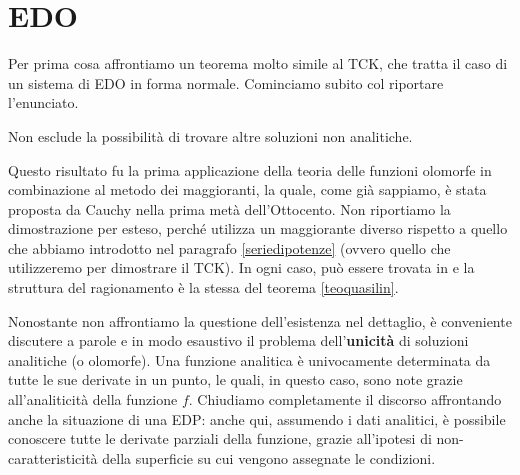 \newpage
\section{EDO}

Per prima cosa affrontiamo un teorema molto simile al TCK, che tratta il caso di un sistema di EDO in forma normale.
Cominciamo subito col riportare l'enunciato.

\begin{theorem}\label{teoedo}
{
}
\end{theorem}

\begin{remark}
Non esclude la possibilità di trovare altre soluzioni non analitiche.
\end{remark}

Questo risultato fu la prima applicazione della teoria delle funzioni olomorfe in combinazione al metodo dei maggioranti, la quale, come già sappiamo, è stata proposta da Cauchy nella prima metà dell'Ottocento.
Non riportiamo la dimostrazione per esteso, perché utilizza un maggiorante diverso rispetto a quello che abbiamo introdotto nel paragrafo \ref{seriedipotenze} (ovvero quello che utilizzeremo per dimostrare il TCK). 
In ogni caso, può essere trovata in \cite{Delf} e la struttura del ragionamento è la stessa del teorema \ref{teoquasilin}.

Nonostante non affrontiamo la questione dell'esistenza nel dettaglio, è conveniente discutere a parole e in modo esaustivo il problema dell'\textbf{unicità} di soluzioni analitiche (o olomorfe). Una funzione analitica è univocamente determinata da tutte le sue derivate in un punto, le quali, in questo caso, sono note grazie all'analiticità della funzione $f$.
Chiudiamo completamente il discorso affrontando anche la situazione di una EDP: anche qui, assumendo i dati analitici, è possibile conoscere tutte le derivate parziali della funzione, grazie all'ipotesi di non-caratteristicità della superficie su cui vengono assegnate le condizioni.

